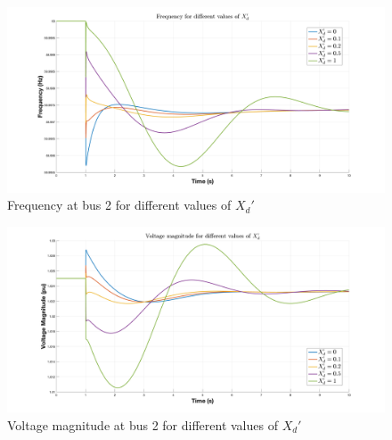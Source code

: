 \begin{figure}[ht!]
    \centering
    \includegraphics[width = \linewidth]{images/omega_varying2.png}
    \caption{Frequency at bus 2 for different values of $X_d'$}
    \label{fig:omega_varying2}
\end{figure}

\begin{figure}[ht!]
    \centering
    \includegraphics[width = \linewidth]{images/voltage_varying2.png}
    \caption{Voltage magnitude at bus 2 for different values of $X_d'$}
    \label{fig:voltage_varying2}
\end{figure}